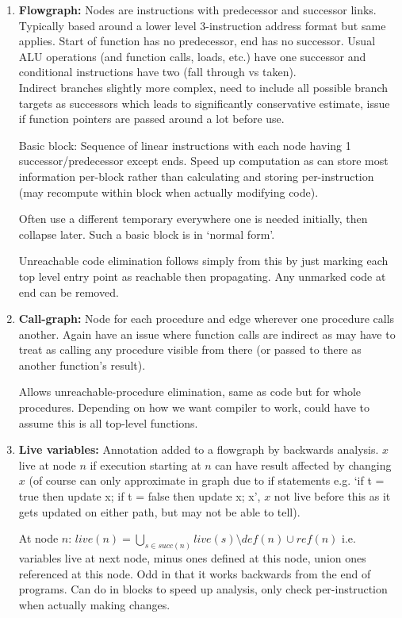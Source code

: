 \documentclass[10pt,twoside,a4paper]{article}
\begin{document}
\begin{enumerate}
\item \textbf{Flowgraph: } Nodes are instructions with predecessor and successor links. Typically based around a lower level 3-instruction address format but same applies. Start of function has no predecessor, end has no successor. Usual ALU operations (and function calls, loads, etc.) have one successor and conditional instructions have two (fall through vs taken). \\
Indirect branches slightly more complex, need to include all possible branch targets as successors which leads to significantly conservative estimate, issue if function pointers are passed around a lot before use. 

Basic block: Sequence of linear instructions with each node having 1 successor/predecessor except ends. Speed up computation as can store most information per-block rather than calculating and storing per-instruction (may recompute within block when actually modifying code).

Often use a different temporary everywhere one is needed initially, then collapse later. Such a basic block is in `normal form'.

Unreachable code elimination follows simply from this by just marking each top level entry point as reachable then propagating. Any unmarked code at end can be removed.

\item \textbf{Call-graph: } Node for each procedure and edge wherever one procedure calls another. Again have an issue where function calls are indirect as may have to treat as calling any procedure visible from there (or passed to there as another function's result).

Allows unreachable-procedure elimination, same as code but for whole procedures. Depending on how we want compiler to work, could have to assume this is all top-level functions. 

\item \textbf{Live variables: } Annotation added to a flowgraph by backwards analysis. $x$ live at node $n$ if execution starting at $n$ can have result affected by changing $x$ (of course can only approximate in graph due to if statements e.g. `if t = true then update x; if t = false then update x; x', $x$ not live before this as it gets updated on either path, but may not be able to tell).

At node $n$: $live(n) = \bigcup_{s \in succ(n)} live(s) \setminus def(n) \cup ref(n)$ i.e. variables live at next node, minus ones defined at this node, union ones referenced at this node. Odd in that it works backwards from the end of programs. Can do in blocks to speed up analysis, only check per-instruction when actually making changes.


\end{enumerate}
\end{document}
